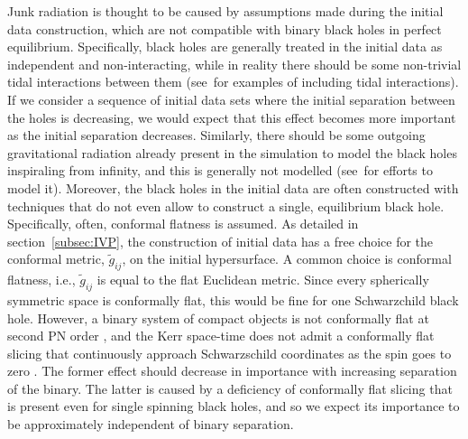 Junk radiation is thought to be caused by assumptions made during the
initial data construction, which are not compatible with binary black holes in perfect equilibrium. Specifically,
 black holes are generally treated in the
initial data as independent and non-interacting, while in reality
there should be some non-trivial tidal interactions between them
(see~ for examples of including tidal interactions). If
we consider a sequence of initial data sets where the initial
separation between the holes is decreasing, we would expect that this
effect becomes more important as the initial separation
decreases. Similarly, there should be some outgoing gravitational
radiation already present in the simulation to model the black holes
inspiraling from infinity, and this is generally not modelled (see~ for efforts to model it).
Moreover, the black holes in the initial data are often constructed
with techniques that do not even allow to construct a single, equilibrium black  hole.  Specifically, often, conformal flatness is assumed. As detailed in section~\ref{subsec:IVP}, the construction of initial data has a
free choice for the conformal metric, $\tilde{g}_{ij}$, on the initial
hypersurface. A common choice is conformal flatness, i.e.,
$\tilde{g}_{ij}$ is equal to the flat Euclidean metric. Since every
spherically symmetric space is conformally flat, this would be fine
for one Schwarzchild black hole. However,  a
binary system of compact objects is not conformally flat at second PN
order , and the Kerr space-time does not admit a
conformally flat slicing that continuously approach Schwarzschild
coordinates as the spin goes to zero . 
The former effect should decrease in importance with increasing separation of the binary.  The latter is caused by a deficiency of conformally flat slicing that is present even for single spinning black holes, and so we expect its importance
to be approximately independent of binary separation.

